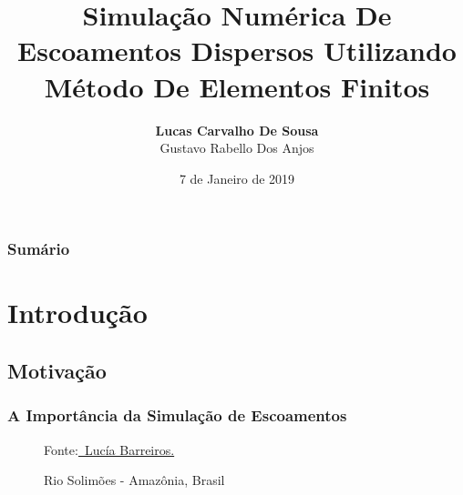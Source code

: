 \documentclass{beamer}
\title[Métodos Numéricos]{Simulação Numérica De Escoamentos Dispersos Utilizando Método De Elementos Finitos} %
\author{\textbf{Lucas Carvalho De Sousa} \\ Gustavo Rabello Dos Anjos} %
\institute[UERJ] %
{
  Universidade do Estado do Rio de Janeiro \\ %
  \medskip
  \href{mailto:encarvlucas@hotmail.com}{\textit{encarvlucas@hotmail.com}} %
}
\date{7 de Janeiro de 2019} %
\newcommand{\figcopyright}[4]
{
  \begin{figure}
    \stackunder{
      \texttt{[image: \#1]}
    } {\raggedleft \tiny Fonte:\href{#2}{\textcopyright \ #3.}}
    \caption{#4}
  \end{figure}
}
\begin{document}
\begin{frame}
  \titlepage %
\end{frame}

\begin{frame}
  \frametitle{Sumário} %
  \tableofcontents %
\end{frame}


\section{Introdução} %

\subsection{Motivação} %
\begin{frame}
  \frametitle{A Importância da Simulação de Escoamentos}
  \figcopyright{figure/Aerial_view_of_the_Amazon_Rainforest.jpg}
	       {https://www.flickr.com/photos/lubasi/4909683043/}
	       {Lucía Barreiros}
	       {Rio Solimões - Amazônia, Brasil}
\end{frame}
\end{document}
